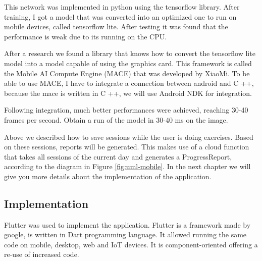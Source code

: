 This network was implemented in python using the tensorflow library. After training, I got a model that was converted into an optimized one to run on mobile devices, called tensorflow lite.
After testing it was found that the performance is weak due to its running on the CPU.

After a research we found a library that knows how to convert the tensorflow lite model into a model capable of using the graphics card. This framework is called the Mobile AI Compute Engine (MACE) that was developed by XiaoMi. To be able to use MACE, I have to integrate a connection between android and C ++, because the mace is written in C ++, we will use Android NDK for integration.

Following integration, much better performances were achieved, reaching 30-40 frames per second. Obtain a run of the model in 30-40 ms on the image.

Above we described how to save sessions while the user is doing exercises.
Based on these sessions, reports will be generated. This makes use of a cloud function that takes all sessions of the current day and generates a ProgressReport, according to the diagram in Figure \ref{fig:uml-mobile}.
In the next chapter we will give you more details about the implementation of the application.

\subsection{Implementation}
Flutter was used to implement the application.
Flutter is a framework made by google, is written in Dart programming language. It allowed running the same code on mobile, desktop, web and IoT devices. It is component-oriented offering a re-use of increased code.

